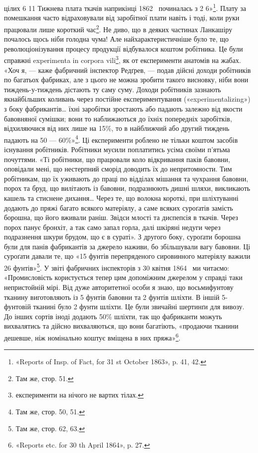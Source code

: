 \parcont{}  %
цілих 6 11 Тижнева плата ткачів наприкінці
1862~ починалась з 2 6»\footnote{
«Reports of Insp. of Fact, for 31 st October 1863», p. 41, 42.
}. Плату за помешкання
часто відраховували від заробітної плати навіть і тоді, коли
руки працювали лише короткий час\footnote{
Там же, стор. 51.
}. Не диво, що в деяких
частинах Ланкашіру почалось щось ніби голодна чума! Але найхарактеристичніше
було те, що революціонізування процесу продукції
відбувалося коштом робітника. Це були справжні experimenta
in corpora vili\footnote*{
експерименти на нічого не вартих тілах. 
}, як от експерименти анатомів на жабах.
«Хоч я, — каже фабричний інспектор Редґрев, — подав дійсні
доходи робітників по багатьох фабриках, але з цього не можна
зробити такого висновку, ніби вони тиждень-у-тиждень дістають
ту саму суму. Доходи робітників зазнають якнайбільших
коливань через постійне експериментування («experimentalizing»)
з боку фабрикантів\dots{} їхні заробітки зростають або падають залежно
від якости бавовняної сумішки; вони то наближаються
до їхніх попередніх заробітків, відхиляючися від них лише на
15\%, то в найближчий або другий тиждень падають на 50 —
60\%»\footnote{
Там же, стор. 50, 51.
}. Ці експерименти роблено не тільки коштом засобів
існування робітників. Робітники мусили поплатитись усіма своїми
п’ятьма почуттями. «Ті робітники, що працювали коло відкривання
паків бавовни, оповідали мені, що нестерпний сморід
доводить їх до непритомности. Тим робітникам, що їх уживають
до праці по відділах мішання та чухрання бавовни, порох та бруд,
що вилітають із бавовни, подразнюють дишні шляхи, викликають
кашель та стиснене дихання\dots{} Через те, що волокна короткі,
при шліхтуванні додають до пряжі багато всякого матеріялу, а
саме всяких суроґатів замість борошна, що його вживали раніш.
Звідси млості та диспепсія в ткачів. Через порох панує бронхіт,
а так само запал горла, далі шкіряні недуги через подразнення
шкури брудом, що є в сураті». З другого боку, суроґати борошна
були для панів фабрикантів за джерело наживи, бо збільшували
вагу бавовни. Ці суроґати давали те, що «15 фунтів перепряденого
сировинного матеріялу важили 26 фунтів»\footnote{
Там же, стор. 62, 63.
}. У звіті фабричних
інспекторів з 30 квітня 1864~ ми читаємо: «Промисловість
користується тепер цим допоміжним джерелом у справді таки
непристойній мірі. Від дуже авторитетної особи я знаю, що восьмифунтову
тканину виготовляють із 5 фунтів бавовни та 2 фунтів
шліхти. В іншій 5-фунтовій тканині було 2 фунти шліхти.
Це були звичайні шертинґи для вивозу. До інших сортів іноді
додають 50\% шліхти, так що фабриканти можуть вихвалятись
та дійсно вихваляються, що вони багатіють, «продаючи тканини
дешевше, ніж номінально коштує вміщена в них пряжа»\footnote{
«Reports etc. for 30 th April 1864», p. 27.
}.
\parbreak{}  %
